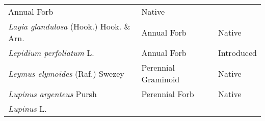 \documentclass[8pt,]{article}
\begin{document}
\begin{longtable}[]{@{}lll@{}}
\begin{minipage}[t]{0.27\columnwidth}
Annual Forb\strut
\end{minipage} & \begin{minipage}[t]{0.15\columnwidth}\raggedright\strut
Native\strut
\end{minipage}\tabularnewline
\begin{minipage}[t]{0.49\columnwidth}\raggedright\strut
\emph{Layia glandulosa} (Hook.) Hook. \& Arn.\strut
\end{minipage} & \begin{minipage}[t]{0.27\columnwidth}\raggedright\strut
Annual Forb\strut
\end{minipage} & \begin{minipage}[t]{0.15\columnwidth}\raggedright\strut
Native\strut
\end{minipage}\tabularnewline
\begin{minipage}[t]{0.49\columnwidth}\raggedright\strut
\emph{Lepidium perfoliatum} L.\strut
\end{minipage} & \begin{minipage}[t]{0.27\columnwidth}\raggedright\strut
Annual Forb\strut
\end{minipage} & \begin{minipage}[t]{0.15\columnwidth}\raggedright\strut
Introduced\strut
\end{minipage}\tabularnewline
\begin{minipage}[t]{0.49\columnwidth}\raggedright\strut
\emph{Leymus elymoides} (Raf.) Swezey\strut
\end{minipage} & \begin{minipage}[t]{0.27\columnwidth}\raggedright\strut
Perennial Graminoid\strut
\end{minipage} & \begin{minipage}[t]{0.15\columnwidth}\raggedright\strut
Native\strut
\end{minipage}\tabularnewline
\begin{minipage}[t]{0.49\columnwidth}\raggedright\strut
\emph{Lupinus argenteus} Pursh\strut
\end{minipage} & \begin{minipage}[t]{0.27\columnwidth}\raggedright\strut
Perennial Forb\strut
\end{minipage} & \begin{minipage}[t]{0.15\columnwidth}\raggedright\strut
Native\strut
\end{minipage}\tabularnewline
\begin{minipage}[t]{0.49\columnwidth}\raggedright\strut
\emph{Lupinus} L.\strut
\end{minipage} & \begin{minipage}[t]{0.27\columnwidth}\raggedright\strut

\end{minipage}
\end{longtable}
\end{document}
